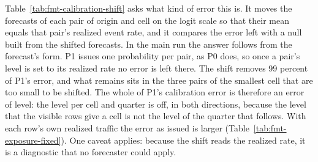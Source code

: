 \begin{table}[t]\centering\scriptsize
\caption{How often the calibration test rejects forecasts that are calibrated by construction, on the headline archive with equal-width bins. Outcomes are drawn 400 times from each rung's own forecasts at a known within-test correlation, and the test is run unchanged on each draw. Columns: the latent correlation that the test's null estimates on the real outcomes, which is the correlation of the null's shared term and not the correlation of outcomes that Table~\ref{tab:fmt-gates-strata} prints; the share of draws it rejects at that correlation, with a Wilson 95 percent interval, where 0.05 is nominal; the same share with no correlation and with twice the correlation; the percentile that a calibrated forecaster stays below in 95 draws of 100; and the percentile observed on the real outcomes. The reading of the check was fixed before it ran.}
\label{tab:fmt-calibration-size}
\resizebox{\columnwidth}{!}{%
}
\end{table}

Table~\ref{tab:fmt-calibration-shift} asks what kind of error this is. It moves the forecasts of each pair of origin and cell on the logit scale so that their mean equals that pair's realized event rate, and it compares the error left with a null built from the shifted forecasts.
In the main run the answer follows from the forecast's form. P1 issues one probability per pair, as P0 does, so once a pair's level is set to its realized rate no error is left there. The shift removes 99 percent of P1's error, and what remains sits in the three pairs of the smallest cell that are too small to be shifted.
The whole of P1's calibration error is therefore an error of level: the level per cell and quarter is off, in both directions, because the level that the visible rows give a cell is not the level of the quarter that follows. With each row's own realized traffic the error as issued is larger (Table~\ref{tab:fmt-exposure-fixed}). One caveat applies: because the shift reads the realized rate, it is a diagnostic that no forecaster could apply.

